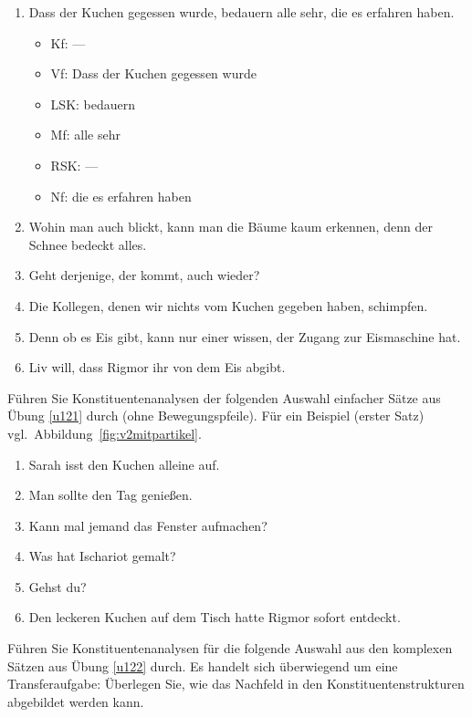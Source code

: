 \begin{enumerate}\Lf
  \item Dass der Kuchen gegessen wurde, bedauern alle sehr, die es erfahren haben.
    \begin{itemize}\Lf
      \item Kf: ---
      \item Vf: Dass der Kuchen gegessen wurde
      \item LSK: bedauern
      \item Mf: alle sehr
      \item RSK: ---
      \item Nf: die es erfahren haben
    \end{itemize}
  \item Wohin man auch blickt, kann man die Bäume kaum erkennen, denn der Schnee bedeckt alles.
  \item Geht derjenige, der kommt, auch wieder?
  \item Die Kollegen, denen wir nichts vom Kuchen gegeben haben, schimpfen.
  \item Denn ob es Eis gibt, kann nur einer wissen, der Zugang zur Eismaschine hat.
  \item Liv will, dass Rigmor ihr von dem Eis abgibt.
\end{enumerate}

\Uebung \label{u123} Führen Sie Konstituentenanalysen der folgenden Auswahl einfacher Sätze aus Übung \ref{u121} durch (ohne Bewegungspfeile).
Für ein Beispiel (erster Satz) vgl.\ Abbildung~\ref{fig:v2mitpartikel}.

\begin{enumerate}\Lf
  \item{Sarah isst den Kuchen alleine auf.}
  \item{Man sollte den Tag genießen.}
  \item{Kann mal jemand das Fenster aufmachen?}
  \item{Was hat Ischariot gemalt?}
  \item{Gehst du?}
  \item{Den leckeren Kuchen auf dem Tisch hatte Rigmor sofort entdeckt.}
\end{enumerate}

\Uebung[\tristar] \label{u124} Führen Sie Konstituentenanalysen für die folgende Auswahl aus den komplexen Sätzen aus Übung \ref{u122} durch.
Es handelt sich überwiegend um eine Transferaufgabe:
Überlegen Sie, wie das Nachfeld in den Konstituentenstrukturen abgebildet werden kann.

